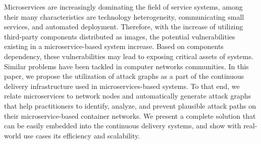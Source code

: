 
Microservices are increasingly dominating the field of service systems, among their many characteristics are technology heterogeneity, communicating small services, and automated deployment. Therefore, with the increase of utilizing third-party components distributed as images, the potential vulnerabilities existing in a microservice-based system increase. Based on components dependency, these vulnerabilities may lead to exposing critical assets of systems. Similar problems have been tackled in computer networks communities. In this paper, we propose the utilization of attack graphs as a part of the continuous delivery infrastructure used in microservices-based systems.  To that end, we relate microservices to network nodes and automatically generate attack graphs that help practitioners to identify, analyze, and prevent plausible attack paths on their microservice-based container networks. We present a complete solution that can be easily embedded into the continuous delivery systems, and show with real-world use cases its efficiency and scalability. 
